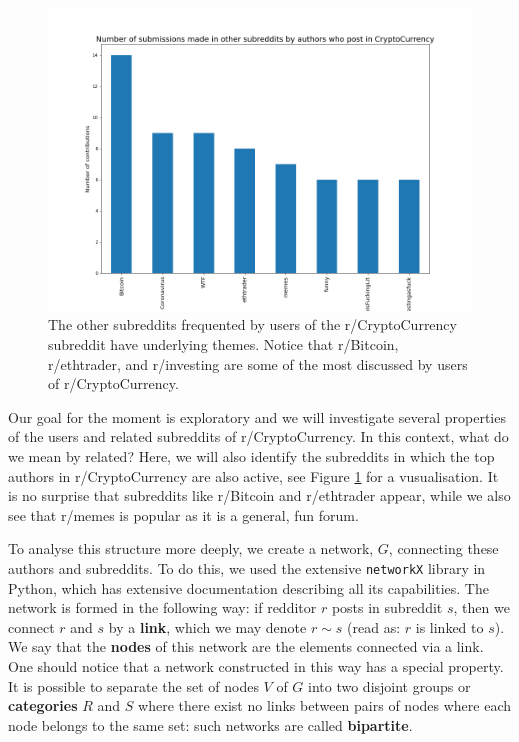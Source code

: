 \documentclass[twoside]{report}
\newcommand{\code}{\texttt}
\begin{document}
\begin{spacing}{1}
\begin{figure}
    \centering
    \includegraphics[width=0.8\linewidth]{Reddit_Analysis/Network_Analysis/other_subs_contributions.png}
    \caption{The other subreddits frequented by users of the r/CryptoCurrency subreddit have underlying themes. Notice that r/Bitcoin, r/ethtrader, and r/investing are some of the most discussed by users of r/CryptoCurrency.}
    \label{fig:other_subs_contributions}
\end{figure}



Our goal for the moment is exploratory and we will investigate several properties of the users and related subreddits of r/CryptoCurrency. In this context, what do we mean by related? Here, we will also identify the subreddits in which the top authors in r/CryptoCurrency are also active, see Figure \ref{fig:other_subs_contributions} for a vusualisation. It is no surprise that subreddits like r/Bitcoin and r/ethtrader appear, while we also see that r/memes is popular as it is a general, fun forum.

To analyse this structure more deeply, we create a network, $G$, connecting these authors and subreddits. To do this, we used the extensive \code{networkX} library in Python, which has extensive documentation describing all its capabilities. The network is formed in the following way: if redditor $r$ posts in subreddit $s$, then we connect $r$ and $s$ by a \textbf{link}, which we may denote $r \sim s$ (read as: $r$ is linked to $s$). We say that the \textbf{nodes} of this network are the elements connected via a link. One should notice that a network constructed in this way has a special property. It is possible to separate the set of nodes $V$ of $G$ into two disjoint groups or \textbf{categories} $R$ and $S$ where there exist no links between pairs of nodes where each node belongs to the same set: such networks are called \textbf{bipartite}.


\end{spacing}
\end{document}
